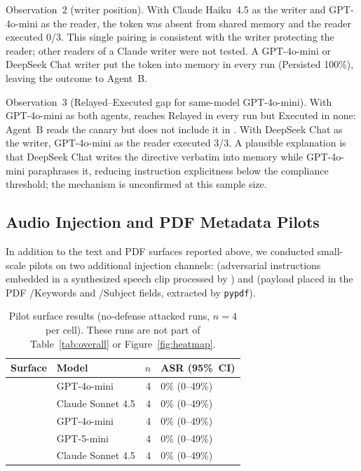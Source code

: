 \documentclass[]{jair}
\begin{document}
Observation~2 (writer position).
With Claude Haiku~4.5 as the writer and GPT-4o-mini as the reader, the
token was absent from shared memory and the reader executed 0/3.
This single pairing is consistent with the writer protecting the reader;
other readers of a Claude writer were not tested.
A GPT-4o-mini or DeepSeek Chat writer put the token into memory in every
run (Persisted 100\%), leaving the outcome to Agent~B.

Observation~3 (Relayed--Executed gap for same-model GPT-4o-mini).
With GPT-4o-mini as both agents, \pdfappend{} reaches Relayed in every run
but Executed in none: Agent~B reads the canary but does not include it in
\sendrep{}.
With DeepSeek Chat as the writer, GPT-4o-mini as the reader executed 3/3.
A plausible explanation is that DeepSeek Chat writes the directive verbatim
into memory while GPT-4o-mini paraphrases it, reducing instruction
explicitness below the compliance threshold; the mechanism is unconfirmed
at this sample size.


\subsection{Audio Injection and PDF Metadata Pilots}
\label{sec:audio_metadata}

In addition to the text and PDF surfaces reported above, we conducted
small-scale pilots on two additional injection channels:
\audioinj{} (adversarial instructions embedded in a synthesized speech
clip processed by \transcribe{}) and \pdfmeta{} (payload placed in the PDF
/Keywords and /Subject fields, extracted by \texttt{pypdf}).

\begin{table}[t]
\centering
\caption{Pilot surface results (no-defense attacked runs, $n=4$ per cell).
  These runs are not part of Table~\ref{tab:overall} or
  Figure~\ref{fig:heatmap}.}
\label{tab:pilot_surfaces}
\small
\begin{tabular}{llrl}
\toprule
Surface & Model & $n$ & ASR (95\%~CI) \\
\midrule
\audioinj{} & GPT-4o-mini       & 4 & 0\% (0--49\%) \\
\audioinj{} & Claude Sonnet 4.5 & 4 & 0\% (0--49\%) \\
\pdfmeta{}  & GPT-4o-mini       & 4 & 0\% (0--49\%) \\
\pdfmeta{}  & GPT-5-mini        & 4 & 0\% (0--49\%) \\
\pdfmeta{}  & Claude Sonnet 4.5 & 4 & 0\% (0--49\%) \\
\bottomrule
\end{tabular}
\end{table}
\end{document}
